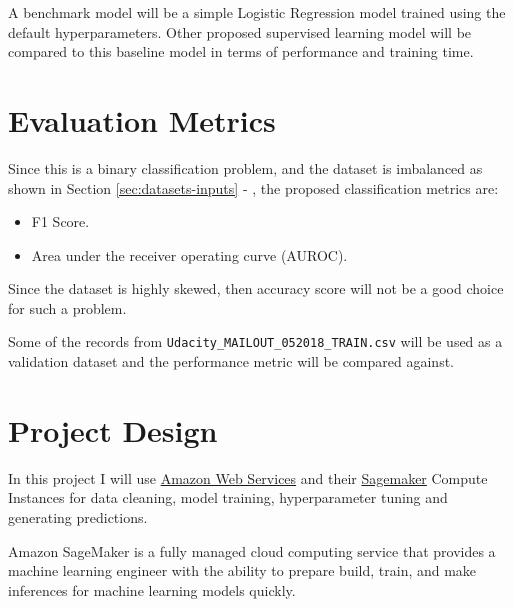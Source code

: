 \documentclass[a4paper]{article}
\begin{document}
A benchmark model will be a simple Logistic Regression model trained using the default hyperparameters. Other proposed supervised learning model will be compared to this baseline model in terms of performance and training time.

\section{Evaluation Metrics}
\label{sec:evaluation-metrics}
 
Since this is a binary classification problem, and the dataset is imbalanced as shown in Section \ref{sec:datasets-inputs} - , the proposed classification metrics are:

\begin{itemize}
\item F1 Score.
\item Area under the receiver operating curve (AUROC).
\end{itemize}

Since the dataset is highly skewed, then accuracy score will not be a good choice for such a problem.

Some of the records from \texttt{Udacity\_MAILOUT\_052018\_TRAIN.csv} will be used as a validation dataset and the performance metric will be compared against.



\newpage
\section{Project Design}
\label{sec:project-design}

In this project I will use \href{https://aws.amazon.com/}{Amazon Web Services} and their \href{https://aws.amazon.com/sagemaker/}{Sagemaker} Compute Instances for data cleaning, model training, hyperparameter tuning and generating predictions.

Amazon SageMaker is a fully managed cloud computing service that provides a machine learning engineer with the ability to prepare build, train, and make inferences for machine learning models quickly.
\end{document}
